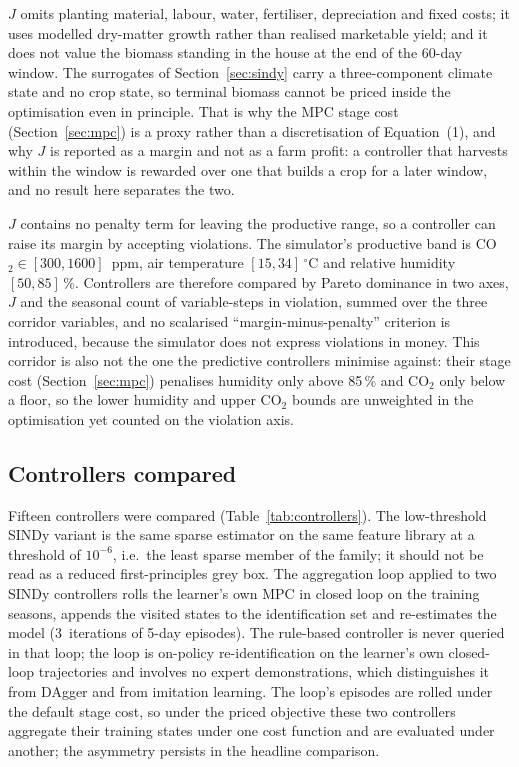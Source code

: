 $J$ omits planting material, labour, water, fertiliser, depreciation and fixed costs; it
uses modelled dry-matter growth rather than realised marketable yield; and it does not
value the biomass standing in the house at the end of the 60-day window. The surrogates of
Section~\ref{sec:sindy} carry a three-component climate state and no crop state, so
terminal biomass cannot be priced inside the optimisation even in principle. That is why
the MPC stage cost (Section~\ref{sec:mpc}) is a proxy rather than a discretisation of
Equation~(1), and why $J$ is reported as a margin and not as a farm
profit: a controller that harvests within the window is rewarded over one that builds a
crop for a later window, and no result here separates the two.

$J$ contains no penalty term for leaving the productive range, so a controller can raise
its margin by accepting violations. The simulator's productive band is CO$_2\in[300,1600]$~ppm, air temperature
$[15,34]\,^\circ$C and relative humidity $[50,85]\,\%$. Controllers are therefore
compared by Pareto dominance in two axes, $J$ and the seasonal count of variable-steps in violation, summed over the three corridor variables, and no scalarised ``margin-minus-penalty'' criterion is introduced,
because the simulator does not express violations in money. This corridor is also not the
one the predictive controllers minimise against: their stage cost (Section~\ref{sec:mpc})
penalises humidity only above 85\,\% and CO$_2$ only below a floor, so the
lower humidity and upper CO$_2$ bounds are unweighted in the optimisation yet counted on
the violation axis.

\subsection{Controllers compared}
\label{sec:controllers}

Fifteen controllers were compared (Table~\ref{tab:controllers}). The
low-threshold SINDy variant is the same sparse estimator on the same feature library at a
threshold of $10^{-6}$, i.e.\ the least sparse member of the family; it should not be
read as a reduced first-principles grey box. The aggregation loop applied to two SINDy
controllers rolls the learner's own MPC in closed loop on the training seasons, appends
the visited states to the identification set and re-estimates the model (3~iterations of
5-day episodes). The rule-based controller is never queried in that loop; the loop is
on-policy re-identification on the learner's own closed-loop trajectories and involves no
expert demonstrations, which distinguishes it from DAgger and from imitation learning.
The loop's episodes are rolled under the default stage cost, so under the priced
objective these two controllers aggregate their training states under one cost function
and are evaluated under another; the asymmetry persists in the headline comparison.

